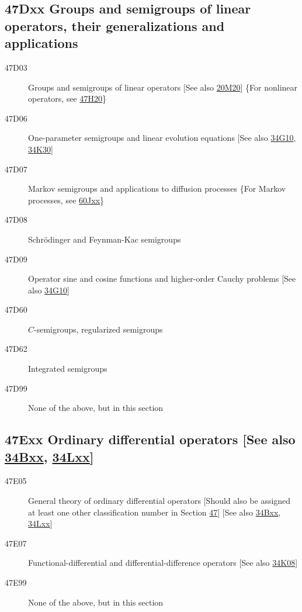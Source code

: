 \subsection*{47Dxx  Groups and semigroups of linear operators, their generalizations and applications }\label{47Dxx}
\begin{description}  
\item [47D03]\label{47D03} Groups and semigroups of linear operators [See also \hyperref[20M20]{20M20}] \{For nonlinear operators, see \hyperref[47H20]{47H20}\}
\item [47D06]\label{47D06} One-parameter semigroups and linear evolution equations [See also \hyperref[34G10]{34G10}, \hyperref[34K30]{34K30}]
\item [47D07]\label{47D07} Markov semigroups and applications to diffusion processes \{For Markov processes, see \hyperref[60Jxx]{60Jxx}\}
\item [47D08]\label{47D08} Schr\"{o}dinger and Feynman-Kac semigroups
\item [47D09]\label{47D09} Operator sine and cosine functions and higher-order Cauchy problems [See also \hyperref[34G10]{34G10}]
\item [47D60]\label{47D60} $C$-semigroups, regularized semigroups
\item [47D62]\label{47D62} Integrated semigroups
\item [47D99]\label{47D99} None of the above, but in this section
\end{description}
\subsection*{47Exx  Ordinary differential operators [See also \hyperref[34Bxx]{34Bxx}, \hyperref[34Lxx]{34Lxx}] }\label{47Exx}
\begin{description}  
\item [47E05]\label{47E05} General theory of ordinary differential operators [Should also be assigned at least one other classification number in Section \hyperref[47-XX]{47}] [See also \hyperref[34Bxx]{34Bxx}, \hyperref[34Lxx]{34Lxx}]
\item [47E07]\label{47E07} Functional-differential and differential-difference operators [See also \hyperref[34K08]{34K08}]
\item [47E99]\label{47E99} None of the above, but in this section
\end{description}
